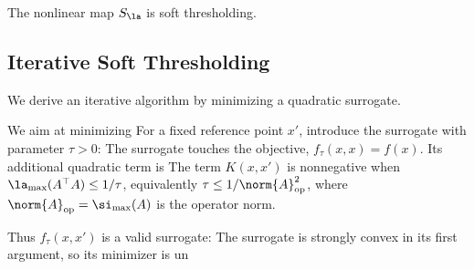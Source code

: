 The nonlinear map $S_\la$ is soft thresholding.

                                                                        
\subsection{Iterative Soft Thresholding}
\label{sec-ml-ista}


We derive an iterative algorithm by minimizing a quadratic surrogate.
 
We aim at minimizing
For a fixed reference point $x'$, introduce the surrogate with parameter $\tau>0$:
The surrogate touches the objective, $f_\tau(x,x)=f(x)$. Its additional quadratic term is
The term $K(x,x')$ is nonnegative when $\la_{\max}(A^\top A) \leq 1/\tau$, equivalently $\tau \leq 1/\norm{A}_{\text{op}}^2$, where $\norm{A}_{\text{op}} = \si_{\max}(A)$ is the operator norm.
 
Thus $f_\tau(x,x')$ is a valid surrogate:
The surrogate is strongly convex in its first argument, so its minimizer is un